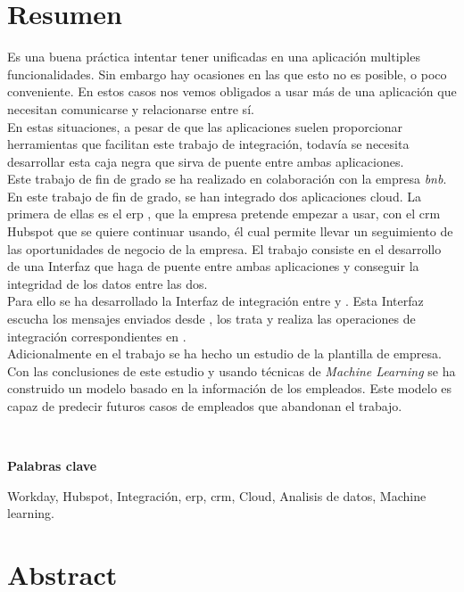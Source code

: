 \chapter*{Resumen}
	
	Es una buena práctica intentar tener unificadas en una aplicación multiples funcionalidades.
	Sin embargo hay ocasiones en las que esto no es posible, o poco conveniente.
	En estos casos nos vemos obligados a usar más de una aplicación que necesitan comunicarse y relacionarse entre sí.\\
	
	En estas situaciones, a pesar de que las aplicaciones suelen proporcionar herramientas que facilitan este trabajo de integración, todavía se necesita desarrollar esta
	caja negra que sirva de puente entre ambas aplicaciones.\\
	
	Este trabajo de fin de grado se ha realizado en colaboración con la empresa \textit{\acrfull{bnb}}.
	En este trabajo de fin de grado, se han integrado dos aplicaciones cloud. La primera de ellas es el \acrshort{erp} \wday{}, que la empresa pretende empezar a usar,
	con el \acrshort{crm} Hubspot que se quiere continuar usando, él cual permite llevar un seguimiento de las oportunidades de negocio de la empresa.
	El trabajo consiste en el desarrollo de una Interfaz que haga de puente entre ambas aplicaciones y conseguir la integridad de los datos entre las dos. \\
	
	
	Para ello se ha desarrollado la Interfaz de integración entre \hs{} y \wday{}. Esta Interfaz escucha los mensajes enviados desde \hs{}, los trata y realiza las operaciones de integración correspondientes en \wday{}.\\

	
	
	Adicionalmente en el trabajo se ha hecho un estudio de la plantilla de empresa.
	Con las conclusiones de este estudio y usando técnicas de \textit{Machine Learning} se ha construido
	un modelo basado en la información de los empleados. Este modelo es capaz de predecir futuros casos de empleados que abandonan el trabajo.
	

	\
	
	\textbf{Palabras clave}
    
    Workday, Hubspot, Integración, \acrfull{erp}, \acrfull{crm}, Cloud, Analisis de datos, Machine learning.


\chapter*{Abstract}
	
